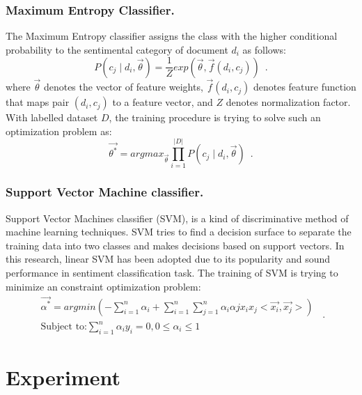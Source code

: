 \documentclass{llncs}
\begin{document}
\subsubsection{Maximum Entropy Classifier.}
\label{entropy}
The Maximum Entropy classifier assigns the class with the higher conditional probability to the sentimental category of document $ d_{i} $ as follows:
\begin{equation}
\label{e5}
P \left( c_{j} \mid d_{i}, \overrightarrow{\theta} \right) = \frac{1}{Z}exp \left( \overrightarrow{\theta}, \overrightarrow{f} \left( d_{i},c_{j} \right) \right) \enspace .
\end{equation}
where $ \overrightarrow{\theta} $ denotes the vector of feature weights, $ \overrightarrow{f} \left( d_{i}, c_{j} \right)$ denotes feature function that maps pair $ \left( d_{i}, c_{j} \right) $ to a feature vector, and $ Z $ denotes normalization factor.
With labelled dataset $ D $, the training procedure is trying to solve such an optimization problem as:
\begin{equation}
\label{e6}
\overrightarrow{\theta^{\ast}}=argmax_{\overrightarrow{\theta}}\prod_{i=1}^{|D|} P \left( c_{j} \mid d_{i}, \overrightarrow{\theta} \right) \enspace .
\end{equation} 
\subsubsection{Support Vector Machine classifier.}
\label{svm}
Support Vector Machines classifier (SVM), is a kind of discriminative method of machine learning techniques.
SVM tries to find a decision surface to separate the training data into two classes and makes decisions based on support vectors. 
In this research, linear SVM has been adopted due to its popularity and sound performance in sentiment classification task.
The training of SVM is trying to minimize an constraint optimization problem:
\begin{equation}
\label{e7}
\begin{aligned}
\overrightarrow{\alpha^{\ast}}=argmin \left( -\sum_{i=1}^{n}\alpha_{i} + \sum_{i=1}^{n} \sum_{j=1}^{n}\alpha_{i}\alpha{j} x_{i}x_{j}<\overrightarrow{x_{i}},\overrightarrow{x_{j}}> \right)\\
\mbox{Subject to:} \sum_{i=1}^{n}\alpha_{i}y_{i}=0 , 0\leqslant \alpha_{i} \leqslant 1
\end{aligned} \enspace .
\end{equation}

\section{Experiment}
\label{experiment}
\end{document}
